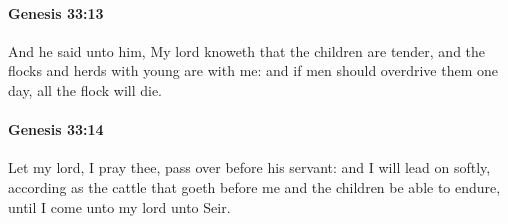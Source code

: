 		\paragraph{Genesis 33:13} %
			\label{GENESIS-33-13}

			And he said unto him, My lord knoweth that the children are tender, and the flocks and herds with young are with me: and if men should overdrive them one day, all the flock will die.


		\paragraph{Genesis 33:14} %
			\label{GENESIS-33-14}

			Let my lord, I pray thee, pass over before his servant: and I will lead on softly, according as the cattle that goeth before me and the children be able to endure, until I come unto my lord unto Seir.

